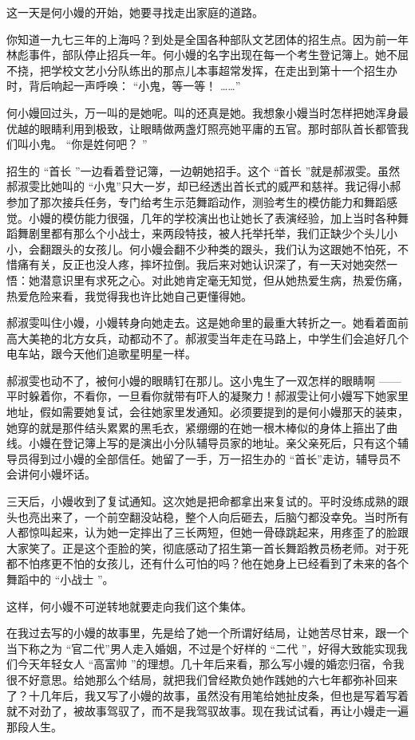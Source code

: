 \documentclass[12pt,twoside,openany]{book}
\begin{document}
这一天是何小嫚的开始，她要寻找走出家庭的道路。

你知道一九七三年的上海吗？到处是全国各种部队文艺团体的招生点。因为前一年林彪事件，部队停止招兵一年。何小嫚的名字出现在每一个考生登记簿上。她不屈不挠，把学校文艺小分队练出的那点儿本事超常发挥，在走出到第十一个招生办时，背后响起一声呼唤： “小鬼，等一等！ ……”

何小嫚回过头，万一叫的是她呢。叫的还真是她。我想象小嫚当时怎样把她浑身最优越的眼睛利用到极致，让眼睛做两盏灯照亮她平庸的五官。那时部队首长都管我们叫小鬼。 “你是姓何吧？ ”

招生的 “首长 ”一边看着登记簿，一边朝她招手。这个 “首长 ”就是郝淑雯。虽然郝淑雯比她叫的 “小鬼”只大一岁，却已经透出首长式的威严和慈祥。我记得小郝参加了那次接兵任务，专门给考生示范舞蹈动作，测验考生的模仿能力和舞蹈感觉。小嫚的模仿能力很强，几年的学校演出也让她长了表演经验，加上当时各种舞蹈舞剧里都有那么个小战士，来两段特技，被人托举托举，我们正缺少个头儿小小，会翻跟头的女孩儿。何小嫚会翻不少种类的跟头，我们认为这跟她不怕死，不惜痛有关，反正也没人疼，摔坏拉倒。我后来对她认识深了，有一天对她突然一悟：她潜意识里有求死之心。对此她肯定毫无知觉，但从她热爱生病，热爱伤痛，热爱危险来看，我觉得我也许比她自己更懂得她。

郝淑雯叫住小嫚，小嫚转身向她走去。这是她命里的最重大转折之一。她看着面前高大美艳的北方女兵，动都动不了。郝淑雯当年走在马路上，中学生们会追好几个电车站，跟今天他们追歌星明星一样。

郝淑雯也动不了，被何小嫚的眼睛钉在那儿。这小鬼生了一双怎样的眼睛啊 ——平时躲着你，不看你，一旦看你就带有吓人的凝聚力！郝淑雯让何小嫚写下她家里地址，假如需要她复试，会往她家里发通知。必须要提到的是何小嫚那天的装束，她穿的就是那件结头累累的黑毛衣，紧绷绷的在她一根木棒似的身体上箍出了曲线。小嫚在登记簿上写的是演出小分队辅导员家的地址。亲父亲死后，只有这个辅导员得到过小嫚的全部信任。她留了一手，万一招生办的 “首长”走访，辅导员不会讲何小嫚坏话。

三天后，小嫚收到了复试通知。这次她是把命都拿出来复试的。平时没练成熟的跟头也亮出来了，一个前空翻没站稳，整个人向后砸去，后脑勺都没幸免。当时所有人都惊叫起来，认为她一定摔出了三长两短，但她一骨碌跳起来，用疼歪了的脸跟大家笑了。正是这个歪脸的笑，彻底感动了招生第一首长舞蹈教员杨老师。对于死都不怕疼更不怕的女孩儿，还有什么可怕的吗？他在她身上已经看到了未来的各个舞蹈中的 “小战士 ”。

这样，何小嫚不可逆转地就要走向我们这个集体。

在我过去写的小嫚的故事里，先是给了她一个所谓好结局，让她苦尽甘来，跟一个当下称之为 “官二代”男人走入婚姻，不过是个好样的 “二代 ”，好得大致能实现我们今天年轻女人 “高富帅 ”的理想。几十年后来看，那么写小嫚的婚恋归宿，令我很不好意思。给她那么个结局，就把我们曾经欺负她作践她的六七年都弥补回来了？十几年后，我又写了小嫚的故事，虽然没有用笔给她扯皮条，但也是写着写着就不对劲了，被故事驾驭了，而不是我驾驭故事。现在我试试看，再让小嫚走一遍那段人生。
\end{document}

